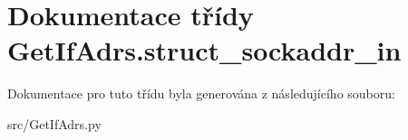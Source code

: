 \hypertarget{classGetIfAdrs_1_1struct__sockaddr__in}{\section{Dokumentace třídy Get\-If\-Adrs.\-struct\-\_\-sockaddr\-\_\-in}
\label{d8/d99/classGetIfAdrs_1_1struct__sockaddr__in}
}


Dokumentace pro tuto třídu byla generována z následujícího souboru\-:\begin{DoxyCompactItemize}
\item 
src/Get\-If\-Adrs.\-py\end{DoxyCompactItemize}
